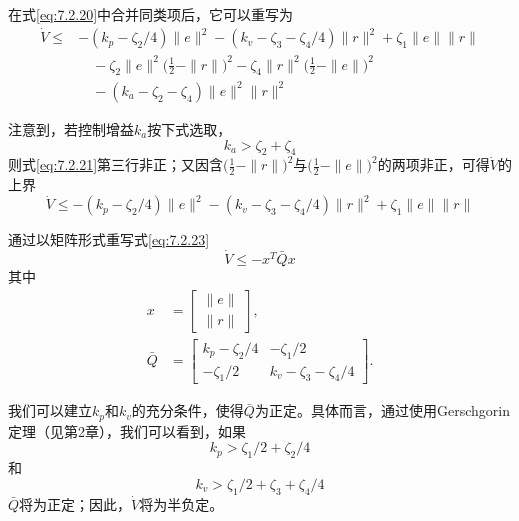 \documentclass[UTF8]{ctexart}
\begin{document}
在式\eqref{eq:7.2.20}中合并同类项后，它可以重写为
\begin{equation}\label{eq:7.2.21}
\begin{aligned}
\dot{V} \leq {} & -(k_p - \zeta_2/4) \|e\|^2 - (k_v - \zeta_3 - \zeta_4/4) \|r\|^2 + \zeta_1 \|e\| \|r\| \\
& \quad {} - \zeta_2 \|e\|^2 \bigl(\tfrac{1}{2} - \|r\|\bigr)^2 - \zeta_4 \|r\|^2 \bigl(\tfrac{1}{2} - \|e\|\bigr)^2 \\
& \quad {} - (k_a - \zeta_2 - \zeta_4) \|e\|^2 \|r\|^2
\end{aligned}
\end{equation}

注意到，若控制增益$k_a$按下式选取，
\begin{equation}\label{eq:7.2.22}
k_a > \zeta_2 + \zeta_4
\end{equation}
则式\eqref{eq:7.2.21}第三行非正；又因含$\bigl(\tfrac{1}{2}-\|r\|\bigr)^2$与$\bigl(\tfrac{1}{2}-\|e\|\bigr)^2$的两项非正，可得$\dot{V}$的上界
\begin{equation}\label{eq:7.2.23}
\dot{V} \leq -(k_p - \zeta_2/4) \|e\|^2 - (k_v - \zeta_3 - \zeta_4/4) \|r\|^2 + \zeta_1 \|e\| \|r\|
\end{equation}

通过以矩阵形式重写式\eqref{eq:7.2.23}
\begin{equation}\label{eq:7.2.24}
\dot{V} \leq -x^T \bar{Q} x
\end{equation}
其中
\begin{align*}
x &= \begin{bmatrix} \|e\| \\ \|r\| \end{bmatrix}, \\
\bar{Q} &= \begin{bmatrix} k_p - \zeta_2/4 & -\zeta_1/2 \\ -\zeta_1/2 & k_v - \zeta_3 - \zeta_4/4 \end{bmatrix}.
\end{align*}

我们可以建立$k_p$和$k_v$的充分条件，使得$\bar{Q}$为正定。具体而言，通过使用Gerschgorin定理（见第2章），我们可以看到，如果
\begin{equation}\label{eq:7.2.25}
k_p > \zeta_1/2 + \zeta_2/4
\end{equation}
和
\begin{equation}\label{eq:7.2.26}
k_v > \zeta_1/2 + \zeta_3 + \zeta_4/4
\end{equation}
$\bar{Q}$将为正定；因此，$\dot{V}$将为半负定。
\end{document}
